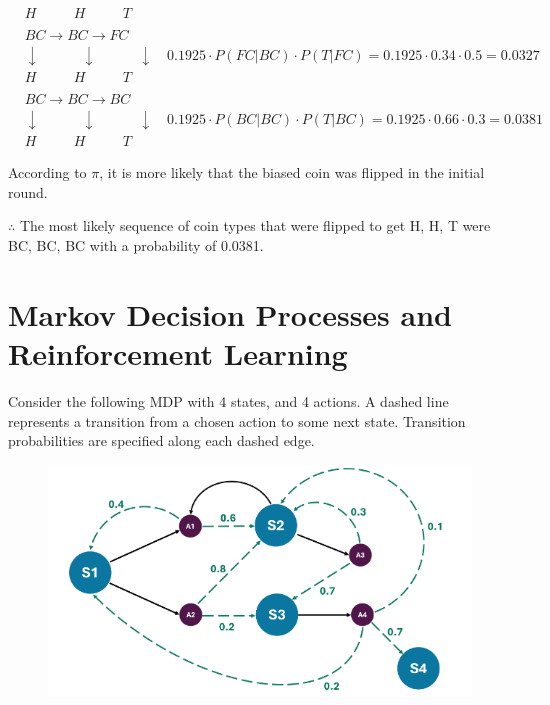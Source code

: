\documentclass[a4paper]{article}
\begin{document}
\begin{sloppypar}
\begin{enumerate}[start=6,label=Q\arabic*,left=0pt]
\begin{align*}
        & H \quad \quad \:\:\: H \quad \quad \:\:\: T \\\\
        & BC \rightarrow BC \rightarrow FC \\
        & \downarrow \quad \quad \quad \downarrow \quad \quad \quad \downarrow \quad 0.1925 \cdot P(FC | BC) \cdot P(T | FC) = 0.1925 \cdot 0.34 \cdot 0.5 = 0.0327 \\
        & H \quad \quad \:\:\: H \quad \quad \:\:\: T \\\\
        & BC \rightarrow BC \rightarrow BC \\
        & \downarrow \quad \quad \quad \downarrow \quad \quad \quad \downarrow \quad 0.1925 \cdot P(BC | BC) \cdot P(T | BC) = 0.1925 \cdot 0.66 \cdot 0.3 = 0.0381 \\
        & H \quad \quad \:\:\: H \quad \quad \:\:\: T
    \end{align*}

    \par According to $\pi$, it is more likely that the biased coin was flipped in the initial round. \newline   

    $\therefore$ The most likely sequence of coin types that were flipped to get H, H, T were BC, BC, BC 
    with a probability of 0.0381.

\end{enumerate}

\section{Markov Decision Processes and Reinforcement Learning}

Consider the following MDP with 4 states, and 4 actions. A dashed line represents a
transition from a chosen action to some next state. Transition probabilities are specified
along each dashed edge.

\begin{figure}[H]
    \centering  
    \includegraphics[height=0.3\textheight]{mdp_and_rl.png}
    \label{fig:mdp_and_rl}
\end{figure}


\end{sloppypar}
\end{document}
